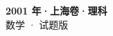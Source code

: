 \documentclass[zihao=-4, a4paper]{ctexart}
\begin{document}
\begin{center}
  {\Large\bfseries 2001 年·上海卷·理科}\\[4pt]
  {\large 数学 · 试题版}
\end{center}
\medskip
{}

\end{document}
